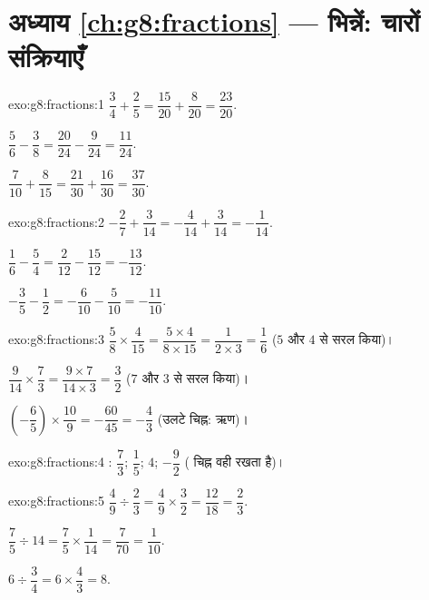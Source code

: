 \section*{अध्याय \ref{ch:g8:fractions} --- भिन्नें: चारों संक्रियाएँ}

\begin{solution}{exo:g8:fractions:1}
$\dfrac34 + \dfrac25 = \dfrac{15}{20} + \dfrac{8}{20} =
\dfrac{23}{20}$.

$\dfrac56 - \dfrac38 = \dfrac{20}{24} - \dfrac{9}{24} =
\dfrac{11}{24}$.

$\dfrac{7}{10} + \dfrac{8}{15} = \dfrac{21}{30} + \dfrac{16}{30} =
\dfrac{37}{30}$.
\end{solution}

\begin{solution}{exo:g8:fractions:2}
$-\dfrac27 + \dfrac{3}{14} = -\dfrac{4}{14} + \dfrac{3}{14} =
-\dfrac{1}{14}$.

$\dfrac16 - \dfrac54 = \dfrac{2}{12} - \dfrac{15}{12} =
-\dfrac{13}{12}$.

$-\dfrac35 - \dfrac12 = -\dfrac{6}{10} - \dfrac{5}{10} =
-\dfrac{11}{10}$.
\end{solution}

\begin{solution}{exo:g8:fractions:3}
$\dfrac58 \times \dfrac{4}{15} = \dfrac{5 \times 4}{8 \times 15}
= \dfrac{1}{2 \times 3} = \dfrac16$ ($5$ और $4$ से सरल किया)।

$\dfrac{9}{14} \times \dfrac73 = \dfrac{9 \times 7}{14 \times 3}
= \dfrac{3}{2}$ ($7$ और $3$ से सरल किया)।

$\left(-\dfrac65\right) \times \dfrac{10}{9} = -\dfrac{60}{45}
= -\dfrac43$ (उलटे चिह्न: ऋण)।
\end{solution}

\begin{solution}{exo:g8:fractions:4}
: $\dfrac73$; \quad $\dfrac15$; \quad $4$; \quad
$-\dfrac92$ ( चिह्न वही रखता है)।
\end{solution}

\begin{solution}{exo:g8:fractions:5}
$\dfrac49 \div \dfrac23 = \dfrac49 \times \dfrac32 = \dfrac{12}{18}
= \dfrac23$.

$\dfrac75 \div 14 = \dfrac75 \times \dfrac{1}{14} = \dfrac{7}{70}
= \dfrac{1}{10}$.

$6 \div \dfrac34 = 6 \times \dfrac43 = 8$.
\end{solution}

